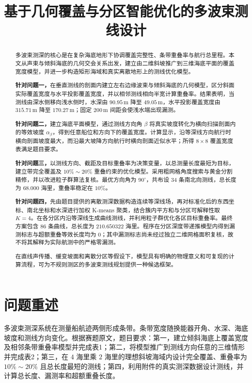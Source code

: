 \documentclass[withoutpreface,notoc]{cumcmthesis}
\title{基于几何覆盖与分区智能优化的多波束测线设计}
\begin{document}
\maketitle

\begin{abstract}
多波束测深的核心是在复杂海底地形下协调覆盖完整性、条带重叠率与航行总里程。本文从声束与倾斜海底的几何交会关系出发，建立由二维斜坡推广到三维海底平面的覆盖宽度模型，并进一步构造矩形海域和真实离散地形上的测线优化模型。

\textbf{针对问题一，}在垂直测线的剖面内建立左右边缘波束与倾斜海底的几何模型，区分斜面实际覆盖宽度与水平投影覆盖宽度，并以相邻测线相向半宽计算重叠率。结果表明，当测线由深水侧移向浅水侧时，水深由 $90.95\,\mathrm m$ 降至 $49.05\,\mathrm m$，水平投影覆盖宽度由 $315.71\,\mathrm m$ 降至 $170.27\,\mathrm m$；固定 $200\,\mathrm m$ 间距会使浅水端出现漏测。

\textbf{针对问题二，}建立海底平面模型，通过测线方向角 $\beta$ 将真实坡度转化为横向扫描剖面内的等效坡度 $\alpha_\beta$，得到任意船位和方向下的覆盖宽度。计算显示，沿等深线方向航行时横向剖面坡度最大，而沿最大坡降方向航行时横向剖面近似水平；所得 $8\times8$ 覆盖宽度表满足题目要求。

\textbf{针对问题三，}以测线方向、截距及目标重叠率为决策变量，以总测量长度最短为目标，建立带完全覆盖及 $10\%\sim20\%$ 重叠约束的优化模型。采用粗网格角度搜索与黄金分割精修，并以改进粒子群算法复核。最优方向角为 $90^\circ$，共布设 34 条南北向测线，总长度为 $68.000$ 海里，重叠率稳定在 $10\%$。

\textbf{针对问题四，}先由题目提供的离散测深数据构造连续等深线场，再对标准化后的东西坐标、南北坐标和水深进行加权 K-means 聚类，结合簇内平方和与分区可解释性取 $K=4$。在各分区内沿等深线生成曲线测线，并利用粒子群优化各区目标重叠率。最终方案包含 86 条曲线，总长度为 $210.650322$ 海里。程序在分区深度带递推模型内得到漏测标志与超额重叠等效长度均为 0；其中漏测标志尚未经过独立二维网格面积复核，故不将其解释为实际航测中的严格零漏测。

在直线声传播、缓变坡面和离散分区等假设下，模型具有明确的物理意义和可复现的计算流程，可为不规则测区的多波束测线规划提供一种候选框架。

\end{abstract}

\section{问题重述}
多波束测深系统在测量船航迹两侧形成条带。条带宽度随换能器开角、水深、海底坡度和测线方向变化。根据赛题原文\cite{cumcm2023b}，题目要求：第一，建立倾斜海底上覆盖宽度及相邻条带重叠率模型并完成表1；第二，将模型推广到测线方向任意的三维情形并完成表2；第三，在 $4$ 海里乘 $2$ 海里的理想斜坡海域内设计完全覆盖、重叠率为 $10\%\sim20\%$ 且总长度最短的测线；第四，利用附件的真实测深数据设计测线，并计算总长度、漏测率和超额重叠长度。
\end{document}
